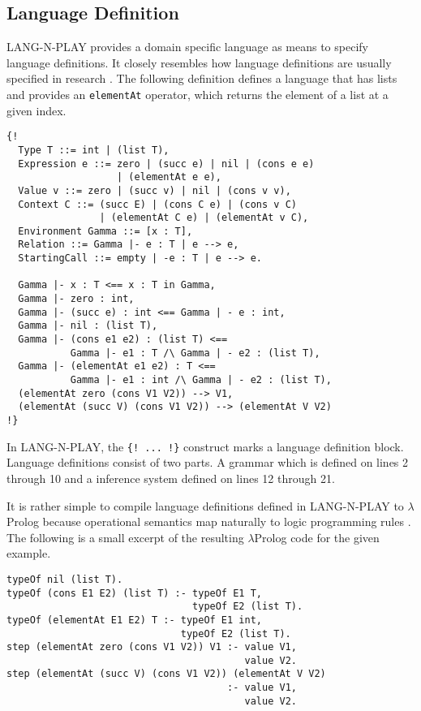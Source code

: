 \subsection{Language Definition}
LANG-N-PLAY provides a domain specific language as means to specify language definitions. It closely resembles how language definitions are usually specified in research \cite{cimini_effectiveness_2020}. The following definition defines a language that has lists and provides an \lstinline{elementAt} operator, which returns the element of a list at a given index.

\begin{verbatim}
{!
  Type T ::= int | (list T),
  Expression e ::= zero | (succ e) | nil | (cons e e)
                   | (elementAt e e),
  Value v ::= zero | (succ v) | nil | (cons v v),
  Context C ::= (succ E) | (cons C e) | (cons v C)
                | (elementAt C e) | (elementAt v C),
  Environment Gamma ::= [x : T],
  Relation ::= Gamma |- e : T | e --> e,
  StartingCall ::= empty | -e : T | e --> e.

  Gamma |- x : T <== x : T in Gamma,
  Gamma |- zero : int,
  Gamma |- (succ e) : int <== Gamma | - e : int,
  Gamma |- nil : (list T),
  Gamma |- (cons e1 e2) : (list T) <==
           Gamma |- e1 : T /\ Gamma | - e2 : (list T),
  Gamma |- (elementAt e1 e2) : T <==
           Gamma |- e1 : int /\ Gamma | - e2 : (list T),
  (elementAt zero (cons V1 V2)) --> V1,
  (elementAt (succ V) (cons V1 V2)) --> (elementAt V V2)
!}
\end{verbatim}

In LANG-N-PLAY, the \lstinline|{! ... !}| construct marks a language definition block. Language definitions consist of two parts. A grammar which is defined on lines 2 through 10 and a inference system defined on lines 12 through 21.

It is rather simple to compile language definitions defined in LANG-N-PLAY to $\lambda$Prolog because operational semantics map naturally to logic programming rules \cite{cimini_effectiveness_2020}. The following is a small excerpt of the resulting $\lambda$Prolog code for the given example.

\begin{verbatim}
typeOf nil (list T).
typeOf (cons E1 E2) (list T) :- typeOf E1 T,
                                typeOf E2 (list T).
typeOf (elementAt E1 E2) T :- typeOf E1 int,
                              typeOf E2 (list T).
step (elementAt zero (cons V1 V2)) V1 :- value V1, 
                                         value V2.
step (elementAt (succ V) (cons V1 V2)) (elementAt V V2)
                                      :- value V1, 
                                         value V2.
\end{verbatim}

